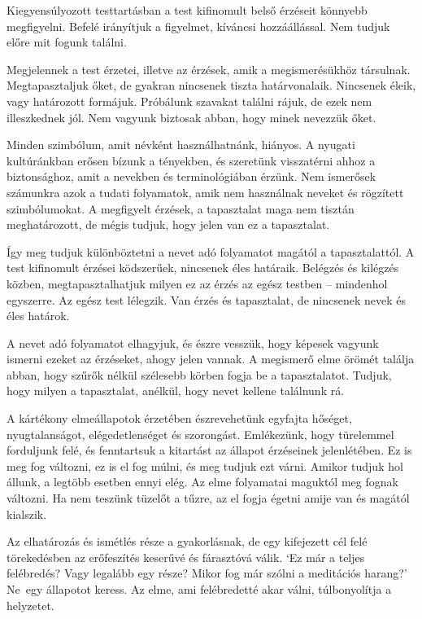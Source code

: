 Kiegyensúlyozott testtartásban a test kifinomult belső érzéseit könnyebb
megfigyelni. Befelé irányítjuk a figyelmet, kíváncsi hozzáállással. Nem
tudjuk előre mit fogunk találni.

Megjelennek a test érzetei, illetve az érzések, amik a megismerésükhöz
társulnak. Megtapasztaljuk őket, de gyakran nincsenek tiszta
határvonalaik. Nincsenek éleik, vagy határozott formájuk. Próbálunk
szavakat találni rájuk, de ezek nem illeszkednek jól. Nem vagyunk
biztosak abban, hogy minek nevezzük őket.

\enlargethispage*{\baselineskip}

Minden szimbólum, amit névként használhatnánk, hiányos. A nyugati
kultúránkban erősen bízunk a tényekben, és szeretünk visszatérni ahhoz a
biztonsághoz, amit a nevekben és terminológiában érzünk. Nem ismerősek
számunkra azok a tudati folyamatok, amik nem használnak neveket és
rögzített szimbólumokat. A megfigyelt érzések, a tapasztalat maga nem
tisztán meghatározott, de mégis tudjuk, hogy jelen van ez a tapasztalat.

Így meg tudjuk különböztetni a nevet adó folyamatot magától a
tapasztalattól. A test kifinomult érzései ködszerűek, nincsenek éles
határaik. Belégzés és kilégzés közben, megtapasztalhatjuk milyen ez az
érzés az egész testben -- mindenhol egyszerre. Az egész test lélegzik.
Van érzés és tapasztalat, de nincsenek nevek és éles határok.

A nevet adó folyamatot elhagyjuk, és észre vesszük, hogy képesek vagyunk
ismerni ezeket az érzéseket, ahogy jelen vannak. A megismerő elme örömét
találja abban, hogy szűrők nélkül szélesebb körben fogja be a
tapasztalatot. Tudjuk, hogy milyen a tapasztalat, anélkül, hogy nevet
kellene találnunk rá.


A kártékony elmeállapotok érzetében észrevehetünk egyfajta hőséget,
nyugtalanságot, elégedetlenséget és szorongást. Emlékezünk, hogy
türelemmel forduljunk felé, és fenntartsuk a kitartást az állapot
érzéseinek jelenlétében. Ez is meg fog változni, ez is el fog múlni, és
meg tudjuk ezt várni. Amikor tudjuk hol állunk, a legtöbb esetben ennyi
elég. Az elme folyamatai maguktól meg fognak változni. Ha nem teszünk
tüzelőt a tűzre, az el fogja égetni amije van és magától kialszik.

Az elhatározás és ismétlés része a gyakorlásnak, de egy kifejezett cél
felé törekedésben az erőfeszítés keserűvé és fárasztóvá válik. `Ez már a
teljes felébredés? Vagy legalább egy része? Mikor fog már szólni a
meditációs harang?' Ne~egy állapotot keress. Az elme, ami felébredetté
akar válni, túlbonyolítja a helyzetet.

